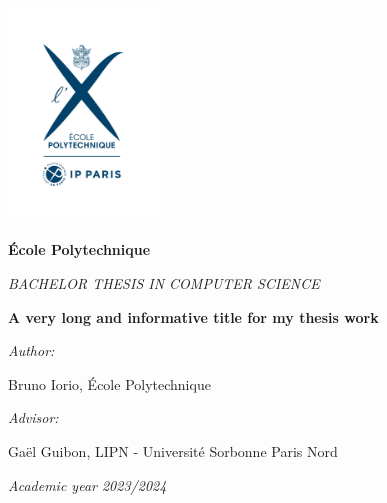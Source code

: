\documentclass[oneside, a4paper, onecolumn, 11pt]{article}
\newcommand{\thesistitle}[0]{A very long and informative title for my thesis work}
\newcommand{\authorname}[0]{Bruno Iorio}
\newcommand{\supervisor}[0]{Gaël Guibon}
\newcommand{\supervisorinstitution}[0]{LIPN - Université Sorbonne Paris Nord}
\begin{document}



\hspace{0pt}
\vfill

\begin{center}

\includegraphics[width=0.3\textwidth]{logo-EP-vertical}

\vspace*{2em}
%
{\large
\textbf{\'Ecole Polytechnique}

\vspace*{1em}
\textit{BACHELOR THESIS IN COMPUTER SCIENCE}


\vspace*{3em}
{\Huge \textbf{\thesistitle}}
\vspace*{3em}



\textit{Author:}

\vspace*{1em}
\authorname{}, \'Ecole Polytechnique

\vspace*{2em}
%
{\textit{Advisor:}}

\vspace*{1em}
\supervisor{}, \supervisorinstitution{}
}

\vspace*{2em}
\textit{Academic year 2023/2024}

\end{center}

\vfill
\hspace{0pt}
\end{document}
